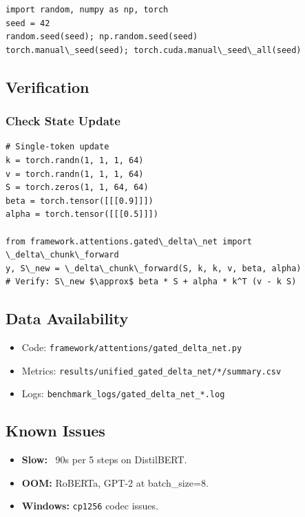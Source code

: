 \begin{lstlisting}
import random, numpy as np, torch
seed = 42
random.seed(seed); np.random.seed(seed)
torch.manual\_seed(seed); torch.cuda.manual\_seed\_all(seed)
\end{lstlisting}

\subsection{Verification}

\subsubsection{Check State Update}

\begin{lstlisting}
# Single-token update
k = torch.randn(1, 1, 1, 64)
v = torch.randn(1, 1, 1, 64)
S = torch.zeros(1, 1, 64, 64)
beta = torch.tensor([[[0.9]]])
alpha = torch.tensor([[[0.5]]])

from framework.attentions.gated\_delta\_net import \_delta\_chunk\_forward
y, S\_new = \_delta\_chunk\_forward(S, k, k, v, beta, alpha)
# Verify: S\_new $\approx$ beta * S + alpha * k^T (v - k S)
\end{lstlisting}

\subsection{Data Availability}

\begin{itemize}
\item Code: \texttt{framework/attentions/gated\_delta\_net.py}
\item Metrics: \texttt{results/unified\_gated\_delta\_net/*/summary.csv}
\item Logs: \texttt{benchmark\_logs/gated\_delta\_net\_*.log}

\end{itemize}
\subsection{Known Issues}

\begin{itemize}
\item \textbf{Slow:} ~90s per 5 steps on DistilBERT.
\item \textbf{OOM:} RoBERTa, GPT-2 at batch\_size=8.
\item \textbf{Windows:} \texttt{cp1256} codec issues.

\end{itemize}
